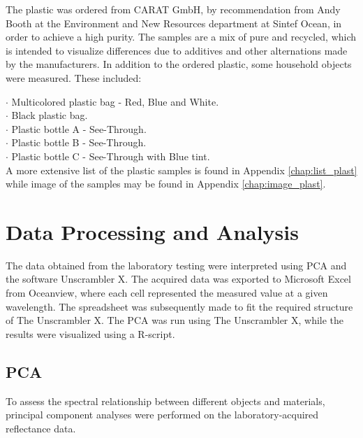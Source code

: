 The plastic was ordered from CARAT GmbH, by recommendation from Andy Booth at the Environment and New Resources department at Sintef Ocean, in order to achieve a high purity. The samples are a mix of pure and recycled, which is intended to visualize differences due to additives and other alternations made by the manufacturers. In addition to the ordered plastic, some household objects were measured. These included:

$\cdot$ Multicolored plastic bag - Red, Blue and White.\\
$\cdot$ Black plastic bag.\\
$\cdot$ Plastic bottle A - See-Through.\\
$\cdot$ Plastic bottle B - See-Through.\\
$\cdot$ Plastic bottle C - See-Through with Blue tint.
\\
A more extensive list of the plastic samples is found in Appendix \autoref{chap:list_plast} while image of the samples may be found in Appendix \autoref{chap:image_plast}.
\section{Data Processing and Analysis}
The data obtained from the laboratory testing were interpreted using PCA and the software Unscrambler X. The acquired data was exported to Microsoft Excel from Oceanview, where each cell represented the measured value at a given wavelength. The spreadsheet was subsequently made to fit the required structure of The Unscrambler X. The PCA was run using The Unscrambler X, while the results were visualized using a R-script.

\subsection{PCA}
To assess the spectral relationship between different objects and materials, principal component analyses were performed on the laboratory-acquired reflectance data. 


